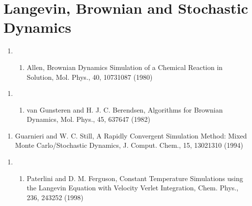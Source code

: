 \documentclass[letterpaper,11pt,english]{sphinxmanual}
\begin{document}
\section{Langevin, Brownian and Stochastic Dynamics}
\label{\detokenize{text/references:langevin-brownian-and-stochastic-dynamics}}\begin{enumerate}
%
\setcounter{enumi}{12}
\item {} \begin{enumerate}
%
\setcounter{enumii}{15}
\item {} 
Allen, Brownian Dynamics Simulation of a Chemical Reaction in Solution, Mol. Phys., 40, 1073\sphinxhyphen{}1087 (1980)

\end{enumerate}

\end{enumerate}
\begin{enumerate}
%
\setcounter{enumi}{22}
\item {} \begin{enumerate}
%
\setcounter{enumii}{5}
\item {} 
van Gunsteren and H. J. C. Berendsen, Algorithms for Brownian Dynamics, Mol. Phys., 45, 637\sphinxhyphen{}647 (1982)

\end{enumerate}

\end{enumerate}
\begin{enumerate}
%
\setcounter{enumi}{5}
\item {} 
Guarnieri and W. C. Still, A Rapidly Convergent Simulation Method: Mixed Monte Carlo/Stochastic Dynamics, J. Comput. Chem., 15, 1302\sphinxhyphen{}1310 (1994)

\end{enumerate}
\begin{enumerate}
%
\setcounter{enumi}{12}
\item {} \begin{enumerate}
%
\setcounter{enumii}{6}
\item {} 
Paterlini and D. M. Ferguson, Constant Temperature Simulations using the Langevin Equation with Velocity Verlet Integration, Chem. Phys., 236, 243\sphinxhyphen{}252 (1998)

\end{enumerate}

\end{enumerate}
\end{document}
